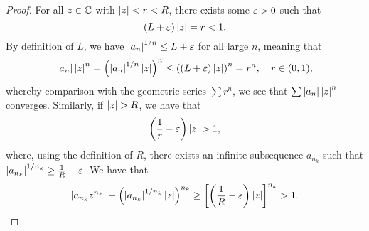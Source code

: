 \begin{proof}
    For all $z \in \mathbb C$ with $\left\lvert z \right\rvert < r < R$, there exists some $\varepsilon > 0$ such that
    \[ (L + \varepsilon)\left\lvert z \right\rvert = r < 1. \]
    By definition of $L$, we have $\left\lvert a_n \right\rvert^{1/n} \leq L + \varepsilon$ for all large $n$, meaning that
    \[ \left\lvert a_n \right\rvert \left\lvert z \right\rvert^n = \left(\left\lvert a_n \right\rvert^{1/n} \left\lvert z \right\rvert\right)^n \leq \left((L + \varepsilon) \left\lvert z \right\rvert\right)^n = r^n, \quad r \in (0, 1), \]
    whereby comparison with the geometric series $\sum r^n$, we see that $\sum \left\lvert a_n \right\rvert \left\lvert z \right\rvert^n$ converges. Similarly, if $\left\lvert z \right\rvert > R$, we have that
    \[ \left(\frac{1}{r} - \varepsilon\right) \left\lvert z \right\rvert > 1, \]
    where, using the definition of $R$, there exists an infinite subsequence $a_{n_k}$ such that $\left\lvert a_{n_k} \right\rvert^{1/n_k} \geq \frac{1}{R} - \varepsilon$. We have that
    \[ \left\lvert a_{n_k} z^{n_k} \right\rvert - \left(\left\lvert a_{n_k} \right\rvert^{1/n_k} \left\lvert z \right\rvert\right)^{n_k} \geq \left[ \left(\frac{1}{R} - \varepsilon\right) \left\lvert z \right\rvert\right]^{n_k} > 1. \qedhere \]
\end{proof}